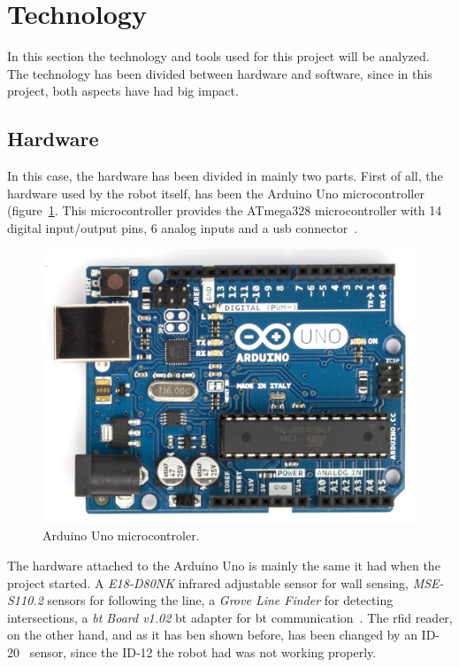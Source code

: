 \section{Technology}

In this section the technology and tools used for this project will be analyzed. The technology has
been divided between hardware and software, since in this project, both aspects have had big impact.

\subsection{Hardware}

In this case, the hardware has been divided in mainly two parts. First of all, the hardware used by
the robot itself, has been the Arduino Uno microcontroller (figure~\ref{fig:arduino_board}. This
microcontroller provides the ATmega328 microcontroller with 14 digital input/output pins, 6 analog
inputs and a \acrshort{usb} connector~\cite{arduino_datasheet}.

\begin{figure}[!htbp]
	\centering
	\includegraphics[height=0.3\textheight]{fig/arduino-board.jpg}
	\caption{Arduino Uno microcontroler.}
	\label{fig:arduino_board}
\end{figure}

The hardware attached to the Arduino Uno is mainly the same it had when the project started. A
\emph{E18-D80NK} infrared adjustable sensor for wall sensing, \emph{MSE-S110.2} sensors for
following the line, a \emph{Grove Line Finder} for detecting intersections, a
\emph{\acrshort{bt} Board v1.02} \acrlong{bt} adapter for \acrlong{bt} communication~\cite{fdp_itu}.
The \acrshort{rfid} reader, on the other hand, and as it has ben shown before, has been changed by
an ID-20~\cite{rfid} sensor, since the ID-12 the robot had was not working properly.

